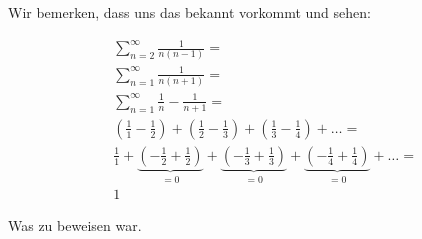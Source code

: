 \documentclass[a4paper,german,12pt,smallheadings]{scrartcl}
\begin{document}
Wir bemerken, dass uns das bekannt vorkommt und sehen:

\begin{align*}
  &\sum_{n=2}^\infty \frac{1}{n(n-1)} =\\
  &\sum_{n=1}^\infty \frac{1}{n(n+1)} =\\
  &\sum_{n=1}^\infty \frac{1}{n} - \frac{1}{n+1} =\\
  &\left(\frac{1}{1} - \frac{1}{2}\right) + \left(\frac{1}{2} - \frac{1}{3}\right) + \left(\frac{1}{3} - \frac{1}{4}\right) + \dots = \\
  &\frac{1}{1} + \underbrace{\left(-\frac{1}{2} + \frac{1}{2}\right)}_{=0} + \underbrace{\left(-\frac{1}{3} + \frac{1}{3}\right)}_{=0} + \underbrace{\left(-\frac{1}{4} + \frac{1}{4}\right)}_{=0} + \dots = \\
  &1
\end{align*}

Was zu beweisen war.
\end{document}
